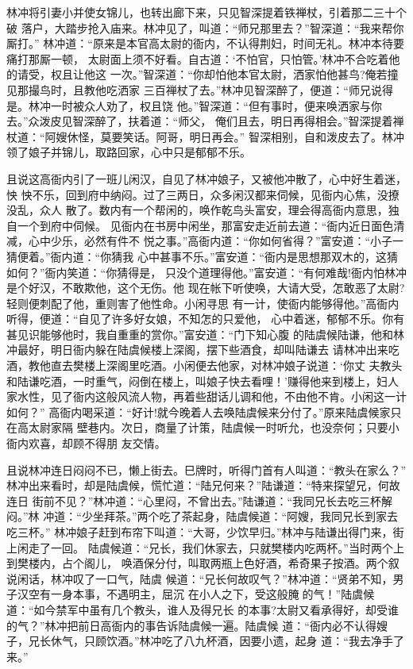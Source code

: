 林冲将引妻小并使女锦儿，也转出廊下来，只见智深提着铁禅杖，引着那二三十个破
落户，大踏步抢入庙来。林冲见了，叫道：“师兄那里去？”智深道：“我来帮你厮打。”
林冲道：“原来是本官高太尉的衙内，不认得荆妇，时间无礼。林冲本待要痛打那厮一顿，
太尉面上须不好看。自古道：‘不怕官，只怕管。’林冲不合吃着他的请受，权且让他这
一次。”智深道：“你却怕他本官太尉，洒家怕他甚鸟?俺若撞见那撮鸟时，且教他吃洒家
三百禅杖了去。”林冲见智深醉了，便道：“师兄说得是。林冲一时被众人劝了，权且饶
他。”智深道：“但有事时，便来唤洒家与你去。”众泼皮见智深醉了，扶着道：“师父，
俺们且去，明日再得相会。”智深提着禅杖道：“阿嫂休怪，莫要笑话。阿哥，明日再会。”
智深相别，自和泼皮去了。林冲领了娘子并锦儿，取路回家，心中只是郁郁不乐。

且说这高衙内引了一班儿闲汉，自见了林冲娘子，又被他冲散了，心中好生着迷，怏
怏不乐，回到府中纳闷。过了三两日，众多闲汉都来伺候，见衙内心焦，没撩没乱，众人
散了。数内有一个帮闲的，唤作乾鸟头富安，理会得高衙内意思，独自一个到府中伺候。
见衙内在书房中闲坐，那富安走近前去道：“衙内近日面色清减，心中少乐，必然有件不
悦之事。”高衙内道：“你如何省得？”富安道：“小子一猜便着。”衙内道：“你猜我
心中甚事不乐。”富安道：“衙内是思想那双木的，这猜如何？”衙内笑道：“你猜得是，
只没个道理得他。”富安道：“有何难哉!衙内怕林冲是个好汉，不敢欺他，这个无伤。他
现在帐下听使唤，大请大受，怎敢恶了太尉?轻则便刺配了他，重则害了他性命。小闲寻思
有一计，使衙内能够得他。”高衙内听得，便道：“自见了许多好女娘，不知怎的只爱他，
心中着迷，郁郁不乐。你有甚见识能够他时，我自重重的赏你。”富安道：“门下知心腹
的陆虞候陆谦，他和林冲最好，明日衙内躲在陆虞候楼上深阁，摆下些酒食，却叫陆谦去
请林冲出来吃酒，教他直去樊楼上深阁里吃酒。小闲便去他家，对林冲娘子说道：‘你丈
夫教头和陆谦吃酒，一时重气，闷倒在楼上，叫娘子快去看哩！’赚得他来到楼上，妇人
家水性，见了衙内这般风流人物，再着些甜话儿调和他，不由他不肯。小闲这一计如何？”
高衙内喝采道：“好计!就今晚着人去唤陆虞候来分付了。”原来陆虞候家只在高太尉家隔
壁巷内。次日，商量了计策，陆虞候一时听允，也没奈何；只要小衙内欢喜，却顾不得朋
友交情。

且说林冲连日闷闷不已，懒上街去。巳牌时，听得门首有人叫道：“教头在家么？”
林冲出来看时，却是陆虞候，慌忙道：“陆兄何来？”陆谦道：“特来探望兄，何故连日
街前不见？”林冲道：“心里闷，不曾出去。”陆谦道：“我同兄长去吃三杯解闷。”林
冲道：“少坐拜茶。”两个吃了茶起身，陆虞候道：“阿嫂，我同兄长到家去吃三杯。”
林冲娘子赶到布帘下叫道：“大哥，少饮早归。”林冲与陆谦出得门来，街上闲走了一回。
陆虞候道：“兄长，我们休家去，只就樊楼内吃两杯。”当时两个上到樊楼内，占个阁儿，
唤酒保分付，叫取两瓶上色好酒，希奇果子按酒。两个叙说闲话，林冲叹了一口气，陆虞
候道：“兄长何故叹气？”林冲道：“贤弟不知，男子汉空有一身本事，不遇明主，屈沉
在小人之下，受这般腌的气！”陆虞候道：“如今禁军中虽有几个教头，谁人及得兄长
的本事?太尉又看承得好，却受谁的气？”林冲把前日高衙内的事告诉陆虞候一遍。陆虞候
道：“衙内必不认得嫂子，兄长休气，只顾饮酒。”林冲吃了八九杯酒，因要小遗，起身
道：“我去净手了来。”

